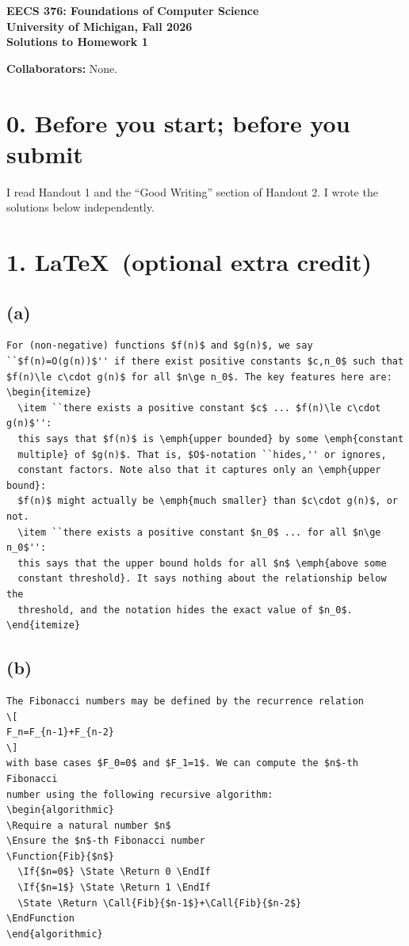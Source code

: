 \documentclass[11pt]{article}
\begin{document}
\begin{center}
{\Large\bf EECS 376: Foundations of Computer Science\\[2pt]
University of Michigan, Fall 2026\\[5pt]
Solutions to Homework 1}
\end{center}
\noindent\textbf{Collaborators:} None.

\section*{0. Before you start; before you submit}
I read Handout 1 and the ``Good Writing'' section of Handout 2.  I wrote the solutions below independently.

\section*{1. \LaTeX\ (optional extra credit)}
\subsection*{(a)}
\begin{Verbatim}
For (non-negative) functions $f(n)$ and $g(n)$, we say
``$f(n)=O(g(n))$'' if there exist positive constants $c,n_0$ such that
$f(n)\le c\cdot g(n)$ for all $n\ge n_0$. The key features here are:
\begin{itemize}
  \item ``there exists a positive constant $c$ ... $f(n)\le c\cdot g(n)$'':
  this says that $f(n)$ is \emph{upper bounded} by some \emph{constant
  multiple} of $g(n)$. That is, $O$-notation ``hides,'' or ignores,
  constant factors. Note also that it captures only an \emph{upper bound}:
  $f(n)$ might actually be \emph{much smaller} than $c\cdot g(n)$, or not.
  \item ``there exists a positive constant $n_0$ ... for all $n\ge n_0$'':
  this says that the upper bound holds for all $n$ \emph{above some
  constant threshold}. It says nothing about the relationship below the
  threshold, and the notation hides the exact value of $n_0$.
\end{itemize}
\end{Verbatim}
\subsection*{(b)}
\begin{Verbatim}
The Fibonacci numbers may be defined by the recurrence relation
\[
F_n=F_{n-1}+F_{n-2}
\]
with base cases $F_0=0$ and $F_1=1$. We can compute the $n$-th Fibonacci
number using the following recursive algorithm:
\begin{algorithmic}
\Require a natural number $n$
\Ensure the $n$-th Fibonacci number
\Function{Fib}{$n$}
  \If{$n=0$} \State \Return 0 \EndIf
  \If{$n=1$} \State \Return 1 \EndIf
  \State \Return \Call{Fib}{$n-1$}+\Call{Fib}{$n-2$}
\EndFunction
\end{algorithmic}
\end{Verbatim}
\end{document}
